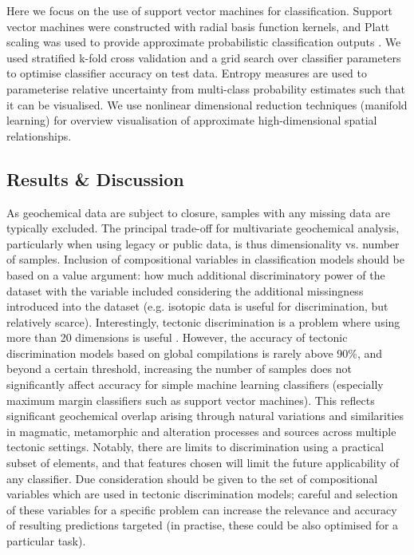 \documentclass[a4,10pt]{article}
\begin{document}
\begin{multicols*}{2}[]
	Here we focus on the use of support vector machines for classification. Support vector machines were constructed with radial basis function kernels, and Platt scaling was used to provide approximate probabilistic classification outputs \citep[][]{Platt2000, Lin2007}. We used stratified k-fold cross validation and a grid search over classifier parameters to optimise classifier accuracy on test data. Entropy measures are used to parameterise relative uncertainty from multi-class probability estimates such that it can be visualised. We use nonlinear dimensional reduction techniques (manifold learning) for overview visualisation of approximate high-dimensional spatial relationships. 
	
	\subsection*{Results \& Discussion}
	
	As geochemical data are subject to closure, samples with any missing data are typically excluded. The principal trade-off for multivariate geochemical analysis, particularly when using legacy or public data, is thus dimensionality vs. number of samples. Inclusion of compositional variables in classification models should be based on a value argument: how much additional discriminatory power of the dataset with the variable included considering the additional missingness introduced into the dataset (e.g. isotopic data is useful for discrimination, but relatively scarce). Interestingly, tectonic discrimination is a problem where using more than 20 dimensions is useful \citep[][]{Petrelli2016, Ueki2018}. However, the accuracy of tectonic discrimination models based on global compilations is rarely above 90\%, and beyond a certain threshold, increasing the number of samples does not significantly affect accuracy for simple machine learning classifiers (especially maximum margin classifiers such as support vector machines). This reflects significant geochemical overlap arising through natural variations and similarities in magmatic, metamorphic and alteration processes and sources across multiple tectonic settings. Notably, there are limits to discrimination using a practical subset of elements, and that features chosen will limit the future applicability of any classifier. Due consideration should be given to the set of compositional variables which are used in tectonic discrimination models; careful and selection of these variables for a specific problem can increase the relevance and accuracy of resulting predictions targeted (in practise, these could be also optimised for a particular task).
	

\end{multicols*}
\end{document}
